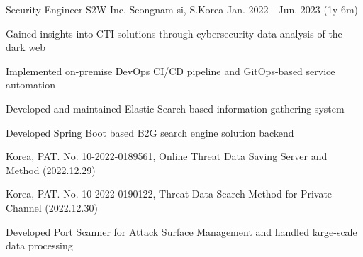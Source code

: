 \begin{cventries}
\cventry
    {Security Engineer} %
    {S2W Inc.} %
    {Seongnam-si, S.Korea} %
    {Jan. 2022 - Jun. 2023 (1y 6m)} %
    {
      \begin{cvitems} %
        \item {Gained insights into CTI solutions through cybersecurity data analysis of the dark web}
        \item {Implemented on-premise DevOps CI/CD pipeline and GitOps-based service automation}
        \item {Developed and maintained Elastic Search-based information gathering system}
        \item {Developed Spring Boot based B2G search engine solution backend}
        \item {Korea, PAT. No. 10-2022-0189561, Online Threat Data Saving Server and Method (2022.12.29)}
        \item {Korea, PAT. No. 10-2022-0190122, Threat Data Search Method for Private Channel (2022.12.30)}
        \item {Developed Port Scanner for Attack Surface Management and handled large-scale data processing}
      \end{cvitems}
    }


\end{cventries}
